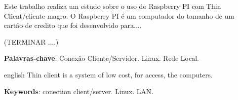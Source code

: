 \documentclass[
	12pt,				%
	openright,			%
	twoside,			%
	a4paper,			%
	chapter=TITLE,		%
	english,			%
	brazil				%
	]{abntex2}
\begin{document}




\setlength{\absparsep}{18pt} %
\begin{resumo}
Este trabalho realiza um estudo sobre o uso do Raspberry PI com Thin Client/cliente magro. O Raspberry PI é um computador do tamanho de um cartão de credito que foi desenvolvido para....

(TERMINAR ....)


 \textbf{Palavras-chave}: Conexão Cliente/Servidor. Linux. Rede Local.	%
\end{resumo}

\begin{resumo}[Abstract]
 \begin{otherlanguage*}{english}
   Thin client is a system of low cost, for access, the computers.

   \vspace{\onelineskip}
 
   \noindent 
   \textbf{Keywords}: conection client/server. Linux. LAN.
 \end{otherlanguage*}
\end{resumo}





\tableofcontents*
\cleardoublepage

\end{document}
